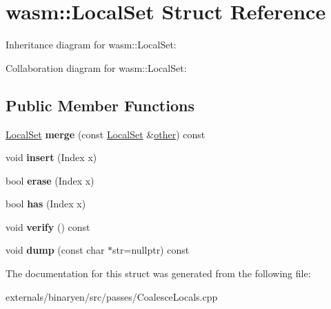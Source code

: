 \hypertarget{structwasm_1_1_local_set}{}\section{wasm\+:\+:Local\+Set Struct Reference}
\label{structwasm_1_1_local_set}


Inheritance diagram for wasm\+:\+:Local\+Set\+:


Collaboration diagram for wasm\+:\+:Local\+Set\+:
\subsection*{Public Member Functions}
\begin{DoxyCompactItemize}
\item 
\mbox{\label{structwasm_1_1_local_set_aec620a637ad234dac354e2599133393c}} 
\mbox{\hyperlink{structwasm_1_1_local_set}{Local\+Set}} {\bfseries merge} (const \mbox{\hyperlink{structwasm_1_1_local_set}{Local\+Set}} \&\mbox{\hyperlink{structother}{other}}) const
\item 
\mbox{\label{structwasm_1_1_local_set_a0c729f48b68b1ce3917495cdb88a4a36}} 
void {\bfseries insert} (Index x)
\item 
\mbox{\label{structwasm_1_1_local_set_a8f0d33a5ba170eaee9469af981e78c19}} 
bool {\bfseries erase} (Index x)
\item 
\mbox{\label{structwasm_1_1_local_set_aed3b15c9698f5066b6a5683606dc764b}} 
bool {\bfseries has} (Index x)
\item 
\mbox{\label{structwasm_1_1_local_set_ad00f5aa9ac80d1babfd073f5241cd6be}} 
void {\bfseries verify} () const
\item 
\mbox{\label{structwasm_1_1_local_set_a4d2bbcf9b5e20c06c1c08b3617a45013}} 
void {\bfseries dump} (const char $\ast$str=nullptr) const
\end{DoxyCompactItemize}


The documentation for this struct was generated from the following file\+:\begin{DoxyCompactItemize}
\item 
externals/binaryen/src/passes/Coalesce\+Locals.\+cpp\end{DoxyCompactItemize}
